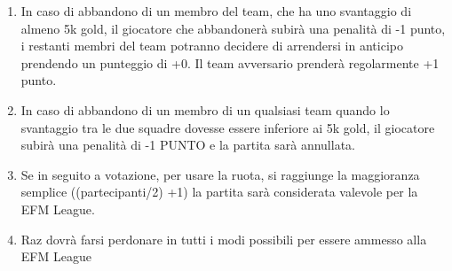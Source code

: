 \documentclass[a4paper, 12pt]{report}
\begin{document}
\begin{enumerate}
  \item In caso di abbandono di un membro del team, che ha uno svantaggio di almeno 5k gold, il giocatore che abbandonerà subirà una penalità di -1 punto, i restanti membri del team potranno decidere di arrendersi in anticipo prendendo un punteggio di +0. Il team avversario prenderà regolarmente +1 punto.
  \item In caso di abbandono di un membro di un qualsiasi team quando lo svantaggio tra le due squadre dovesse essere inferiore ai 5k gold, il giocatore subirà una penalità di -1 PUNTO e la partita sarà annullata.
  \item Se in seguito a votazione, per usare la ruota, si raggiunge la maggioranza semplice ((partecipanti/2) +1) la partita sarà considerata valevole per la EFM League.
  \item Raz dovrà farsi perdonare in tutti i modi possibili per essere ammesso alla EFM League
\end{enumerate}
\end{document}
